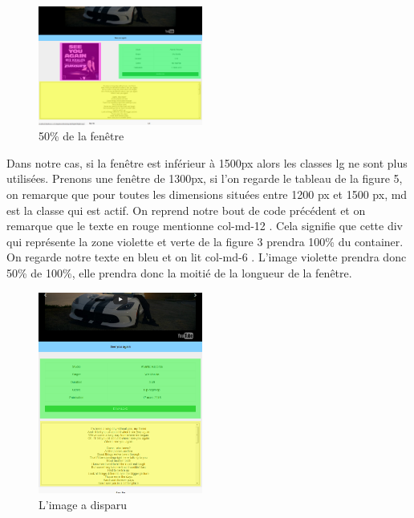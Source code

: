 \documentclass{article}
\begin{document}
\begin{figure}
  \vspace{-20pt}
  \begin{center}
    \includegraphics[width=0.48\textwidth]{p6}
  \end{center}
  \vspace{-20pt}
  \caption{50\% de la fen\^etre}
  \vspace{-10pt}
\end{figure} 

Dans notre cas, si la fen\^etre est inf\'erieur \`a 1500px alors les classes lg ne sont plus utilis\'ees. Prenons une fen\^etre de 1300px, si l'on regarde le tableau de la figure 5, on remarque que pour toutes les dimensions situ\'ees entre 1200 px et 1500 px, md est la classe qui est actif. On reprend notre bout de code pr\'ec\'edent et on remarque que le texte en rouge mentionne \og col-md-12 \fg{}. Cela signifie que cette div qui repr\'esente la zone violette et verte de la figure 3 prendra 100\% du container. On regarde notre texte en bleu et on lit \og col-md-6 \fg{}. L'image violette prendra donc 50\% de 100\%, elle prendra donc la moiti\'e de la longueur de la fen\^etre.\\

\begin{figure}
  \vspace{-20pt}
  \begin{center}
    \includegraphics[width=0.48\textwidth]{p7}
  \end{center}
  \vspace{-20pt}
  \caption{L'image a disparu}
  \vspace{-10pt}
\end{figure} 
\end{document}

